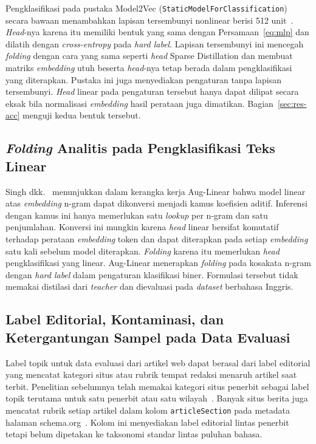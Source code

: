 \documentclass{ieeeaccess}
\newcommand{\en}[1]{\textit{#1}}
\begin{document}
Pengklasifikasi pada pustaka Model2Vec (\texttt{StaticModelForClassification}) secara bawaan menambahkan lapisan tersembunyi nonlinear berisi 512 unit~\cite{tulkens2024model2vec}. \en{Head}-nya karena itu memiliki bentuk yang sama dengan Persamaan~\eqref{eq:mlp} dan dilatih dengan \en{cross-entropy} pada \en{hard label}. Lapisan tersembunyi ini mencegah \en{folding} dengan cara yang sama seperti \en{head} Sparse Distillation dan membuat matriks \en{embedding} utuh beserta \en{head}-nya tetap berada dalam pengklasifikasi yang diterapkan. Pustaka ini juga menyediakan pengaturan tanpa lapisan tersembunyi. \en{Head} linear pada pengaturan tersebut hanya dapat dilipat secara eksak bila normalisasi \en{embedding} hasil perataan juga dimatikan. Bagian~\ref{sec:res-acc} menguji kedua bentuk tersebut.

\subsection{\en{Folding} Analitis pada Pengklasifikasi Teks Linear}
\label{sec:rw-fold}
Singh dkk.~\cite{singh2023auglinear} menunjukkan dalam kerangka kerja Aug-Linear bahwa model linear atas \en{embedding} n-gram dapat dikonversi menjadi kamus koefisien aditif. Inferensi dengan kamus ini hanya memerlukan satu \en{lookup} per n-gram dan satu penjumlahan. Konversi ini mungkin karena \en{head} linear bersifat komutatif terhadap perataan \en{embedding} token dan dapat diterapkan pada setiap \en{embedding} satu kali sebelum model diterapkan. \en{Folding} karena itu memerlukan \en{head} pengklasifikasi yang linear. Aug-Linear menerapkan \en{folding} pada kosakata n-gram dengan \en{hard label} dalam pengaturan klasifikasi biner. Formulasi tersebut tidak memakai distilasi dari \en{teacher} dan dievaluasi pada \en{dataset} berbahasa Inggris.

\subsection{Label Editorial, Kontaminasi, dan Ketergantungan Sampel pada Data Evaluasi}
Label topik untuk data evaluasi dari artikel web dapat berasal dari label editorial yang mencatat kategori situs atau rubrik tempat redaksi menaruh artikel saat terbit. Penelitian sebelumnya telah memakai kategori situs penerbit sebagai label topik terutama untuk satu penerbit atau satu wilayah~\cite{mirashi2023indicnews}. Banyak situs berita juga mencatat rubrik setiap artikel dalam kolom \texttt{articleSection} pada metadata halaman schema.org~\cite{guha2016schema}. Kolom ini menyediakan label editorial lintas penerbit tetapi belum dipetakan ke taksonomi standar lintas puluhan bahasa.
\end{document}

